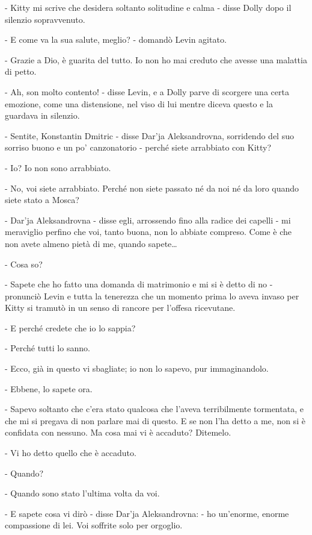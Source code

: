 \label{x-2} 

- Kitty mi scrive che desidera soltanto solitudine e calma - disse Dolly dopo il silenzio sopravvenuto. 

- E come va la sua salute, meglio? - domandò Levin agitato. 

- Grazie a Dio, è guarita del tutto. Io non ho mai creduto che avesse una malattia di petto. 

- Ah, son molto contento! - disse Levin, e a Dolly parve di scorgere una certa emozione, come una distensione, nel viso di lui mentre diceva questo e la guardava in silenzio. 

- Sentite, Konstantin Dmitric - disse Dar'ja Aleksandrovna, sorridendo del suo sorriso buono e un po' canzonatorio - perché siete arrabbiato con Kitty? 

- Io? Io non sono arrabbiato. 

- No, voi siete arrabbiato. Perché non siete passato né da noi né da loro quando siete stato a Mosca? 

- Dar'ja Aleksandrovna - disse egli, arrossendo fino alla radice dei capelli - mi meraviglio perfino che voi, tanto buona, non lo abbiate compreso. Come è che non avete almeno pietà di me, quando sapete\ldots{} 

- Cosa so? 

- Sapete che ho fatto una domanda di matrimonio e mi si è detto di no - pronunciò Levin e tutta la tenerezza che un momento prima lo aveva invaso per Kitty si tramutò in un senso di rancore per l'offesa ricevutane. 

- E perché credete che io lo sappia? 

- Perché tutti lo sanno. 

- Ecco, già in questo vi sbagliate; io non lo sapevo, pur immaginandolo. 

- Ebbene, lo sapete ora. 

- Sapevo soltanto che c'era stato qualcosa che l'aveva terribilmente tormentata, e che mi si pregava di non parlare mai di questo. E se non l'ha detto a me, non si è confidata con nessuno. Ma cosa mai vi è accaduto? Ditemelo. 

- Vi ho detto quello che è accaduto. 

- Quando? 

- Quando sono stato l'ultima volta da voi. 

- E sapete cosa vi dirò - disse Dar'ja Aleksandrovna: - ho un'enorme, enorme compassione di lei. Voi soffrite solo per orgoglio. 

